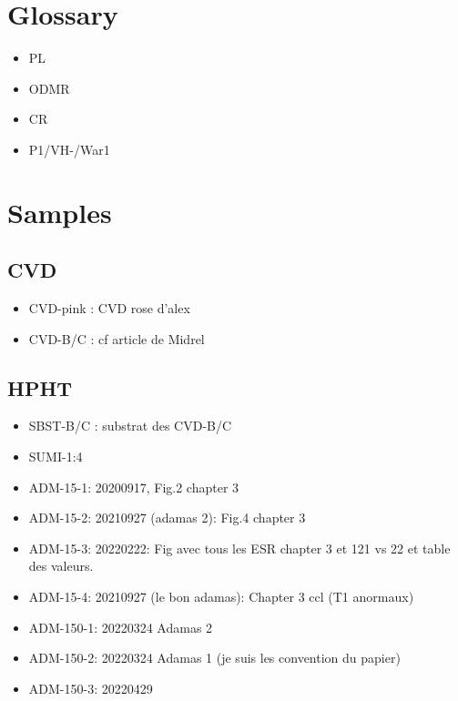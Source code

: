 \documentclass[a4paper]{article}
\begin{document}
\section{Glossary}
\begin{itemize}
\item PL
\item ODMR
\item CR
\item P1/VH-/War1
\end{itemize}
\section{Samples}
\subsection{CVD}
\begin{itemize}
\item CVD-pink : CVD rose d'alex
\item CVD-B/C : cf article de Midrel
\end{itemize}
\subsection{HPHT}
\begin{itemize}
\item SBST-B/C : substrat des CVD-B/C
\item SUMI-1:4
\item ADM-15-1: 20200917, Fig.2 chapter 3
\item ADM-15-2: 20210927 (adamas 2): Fig.4 chapter 3
\item ADM-15-3: 20220222: Fig avec tous les ESR chapter 3 et 121 vs 22 et table des valeurs.
\item ADM-15-4: 20210927 (le bon adamas): Chapter 3 ccl (T1 anormaux)
\item ADM-150-1: 20220324 Adamas 2
\item ADM-150-2: 20220324 Adamas 1 (je suis les convention du papier)
\item ADM-150-3: 20220429
\end{itemize}
\end{document}
